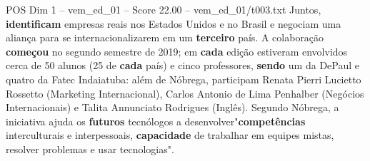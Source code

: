 \begin{textsample}{POS Dim 1 – vem\_ed\_01 – Score 22.00 – vem\_ed\_01/t003.txt}
Juntos, \textbf{identificam} empresas reais nos Estados Unidos e no Brasil e negociam uma aliança para se internacionalizarem em um \textbf{terceiro} país.
A colaboração \textbf{começou} no segundo semestre de 2019; em \textbf{cada} edição estiveram envolvidos cerca de 50 alunos (25 de \textbf{cada} país) e cinco professores, \textbf{sendo} um da DePaul e quatro da Fatec Indaiatuba: além de Nóbrega, participam Renata Pierri Lucietto Rossetto (Marketing Internacional), Carlos Antonio de Lima Penhalber (Negócios Internacionais) e Talita Annunciato Rodrigues (Inglês).
Segundo Nóbrega, a iniciativa ajuda os \textbf{futuros} tecnólogos a desenvolver"\textbf{competências} interculturais e interpessoais, \textbf{capacidade} de trabalhar em equipes mistas, resolver problemas e usar tecnologias".

\end{textsample}
